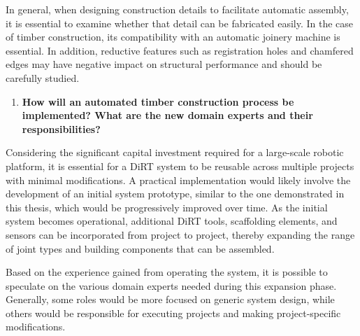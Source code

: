 \documentclass[11pt]{book}
\begin{document}
In general, when designing construction details to facilitate automatic assembly, it is essential to examine whether that detail can be fabricated easily. In the case of timber construction, its compatibility with an automatic joinery machine is essential. In addition, reductive features such as registration holes and chamfered edges may have negative impact on structural performance and should be carefully studied.

\begin{enumerate}
	\item \textbf{How will an automated timber construction process be implemented? What are the new domain experts and their responsibilities?}

\end{enumerate}
Considering the significant capital investment required for a large-scale robotic platform, it is essential for a DiRT system to be reusable across multiple projects with minimal modifications. A practical implementation would likely involve the development of an initial system prototype, similar to the one demonstrated in this thesis, which would be progressively improved over time. As the initial system becomes operational, additional DiRT tools, scaffolding elements, and sensors can be incorporated from project to project, thereby expanding the range of joint types and building components that can be assembled.

Based on the experience gained from operating the system, it is possible to speculate on the various domain experts needed during this expansion phase. Generally, some roles would be more focused on generic system design, while others would be responsible for executing projects and making project-specific modifications.
\end{document}
